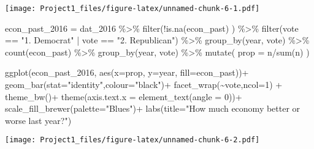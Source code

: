 \documentclass[
]{article}
\newenvironment{Shaded}{\begin{snugshade}}{\end{snugshade}}
\newcommand{\AttributeTok}[1]{\textcolor[rgb]{0.77,0.63,0.00}{#1}}
\newcommand{\DecValTok}[1]{\textcolor[rgb]{0.00,0.00,0.81}{#1}}
\newcommand{\FunctionTok}[1]{\textcolor[rgb]{0.00,0.00,0.00}{#1}}
\newcommand{\NormalTok}[1]{#1}
\newcommand{\OtherTok}[1]{\textcolor[rgb]{0.56,0.35,0.01}{#1}}
\newcommand{\SpecialCharTok}[1]{\textcolor[rgb]{0.00,0.00,0.00}{#1}}
\newcommand{\StringTok}[1]{\textcolor[rgb]{0.31,0.60,0.02}{#1}}
\begin{document}
\texttt{[image: Project1\_files/figure-latex/unnamed-chunk-6-1.pdf]}

\begin{Shaded}
\begin{Highlighting}[]
\NormalTok{econ\_past\_2016 }\OtherTok{=}\NormalTok{ dat\_2016 }\SpecialCharTok{\%\textgreater{}\%}
  \FunctionTok{filter}\NormalTok{(}\SpecialCharTok{!}\FunctionTok{is.na}\NormalTok{(econ\_past) ) }\SpecialCharTok{\%\textgreater{}\%}
  \FunctionTok{filter}\NormalTok{(vote }\SpecialCharTok{==} \StringTok{"1. Democrat"} \SpecialCharTok{|}\NormalTok{ vote }\SpecialCharTok{==} \StringTok{"2. Republican"}\NormalTok{) }\SpecialCharTok{\%\textgreater{}\%}
  \FunctionTok{group\_by}\NormalTok{(year, vote) }\SpecialCharTok{\%\textgreater{}\%}
  \FunctionTok{count}\NormalTok{(econ\_past) }\SpecialCharTok{\%\textgreater{}\%}
  \FunctionTok{group\_by}\NormalTok{(year, vote) }\SpecialCharTok{\%\textgreater{}\%}
  \FunctionTok{mutate}\NormalTok{(}
    \AttributeTok{prop =}\NormalTok{ n}\SpecialCharTok{/}\FunctionTok{sum}\NormalTok{(n)}
\NormalTok{  )}

\FunctionTok{ggplot}\NormalTok{(econ\_past\_2016,}
       \FunctionTok{aes}\NormalTok{(}\AttributeTok{x=}\NormalTok{prop, }\AttributeTok{y=}\NormalTok{year, }\AttributeTok{fill=}\NormalTok{econ\_past))}\SpecialCharTok{+}
  \FunctionTok{geom\_bar}\NormalTok{(}\AttributeTok{stat=}\StringTok{"identity"}\NormalTok{,}\AttributeTok{colour=}\StringTok{"black"}\NormalTok{)}\SpecialCharTok{+}
  \FunctionTok{facet\_wrap}\NormalTok{(}\SpecialCharTok{\textasciitilde{}}\NormalTok{vote,}\AttributeTok{ncol=}\DecValTok{1}\NormalTok{) }\SpecialCharTok{+}
  \FunctionTok{theme\_bw}\NormalTok{()}\SpecialCharTok{+}
  \FunctionTok{theme}\NormalTok{(}\AttributeTok{axis.text.x =} \FunctionTok{element\_text}\NormalTok{(}\AttributeTok{angle =} \DecValTok{0}\NormalTok{))}\SpecialCharTok{+}
  \FunctionTok{scale\_fill\_brewer}\NormalTok{(}\AttributeTok{palette=}\StringTok{"Blues"}\NormalTok{)}\SpecialCharTok{+}
  \FunctionTok{labs}\NormalTok{(}\AttributeTok{title=}\StringTok{"How much economy better or worse last year?"}\NormalTok{)}
\end{Highlighting}
\end{Shaded}

\texttt{[image: Project1\_files/figure-latex/unnamed-chunk-6-2.pdf]}
\end{document}

